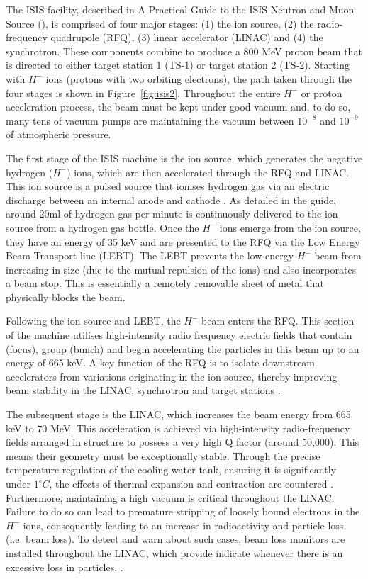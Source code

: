 \documentclass[10pt,oneside]{report}
\begin{document}
The ISIS facility, described in A Practical Guide to the ISIS Neutron and Muon Source (\citet{2021practicalguide}), is comprised of four major stages: (1) the ion source, (2) the radio-frequency quadrupole (RFQ), (3) linear accelerator (LINAC) and (4) the synchrotron. These components combine to produce a 800 MeV proton beam that is directed to either target station 1 (TS-1) or target station 2 (TS-2). Starting with $H^-$ ions (protons with two orbiting electrons), the path taken through the four stages is shown in Figure~\ref{fig:isis2}. Throughout the entire $H^-$ or proton acceleration process, the beam must be kept under good vacuum and, to do so, many tens of vacuum pumps are maintaining the vacuum between $10^{-8}$ and $10^{-9}$ of atmospheric pressure.

The first stage of the ISIS machine is the ion source, which generates the negative hydrogen ($H^-$) ions, which are then accelerated through the RFQ and LINAC. This ion source is a pulsed source that ionises hydrogen gas via an electric discharge between an internal anode and cathode \cite{2021practicalguide}. As detailed in the guide, around 20ml of hydrogen gas per minute is continuously delivered to the ion source from a hydrogen gas bottle. Once the $H^-$ ions emerge from the ion source, they have an energy of 35 keV and are presented to the RFQ via the Low Energy Beam Transport line (LEBT). The LEBT prevents the low-energy $H^-$ beam from increasing in size (due to the mutual repulsion of the ions) and also incorporates a beam stop. This is essentially a remotely removable sheet of metal that physically blocks the beam.

Following the ion source and LEBT, the $H^-$ beam enters the RFQ. This section of the machine utilises high-intensity radio frequency electric fields that contain (focus), group (bunch) and begin accelerating the particles in this beam up to an energy of 665 keV. A key function of the RFQ is to isolate downstream accelerators from variations originating in the ion source, thereby improving beam stability in the LINAC, synchrotron and target stations \cite{2021practicalguide}. 

The subsequent stage is the LINAC, which increases the beam energy from 665 keV to 70 MeV. This acceleration is achieved via high-intensity radio-frequency fields arranged in structure to possess a very high Q factor \cite{michael2006electronic} (around 50,000). This means their geometry must be exceptionally stable. Through the precise temperature regulation of the cooling water tank, ensuring it is significantly under $1^\circ C$, the effects of thermal expansion and contraction are countered \cite{2021practicalguide}. Furthermore, maintaining a high vacuum is critical throughout the LINAC. Failure to do so can lead to premature stripping of loosely bound electrons in the $H^-$ ions, consequently leading to an increase in radioactivity and particle loss (i.e. beam loss). To detect and warn about such cases, beam loss monitors are installed throughout the LINAC, which provide indicate whenever there is an excessive loss in particles. \cite{2021practicalguide}.
\end{document}
